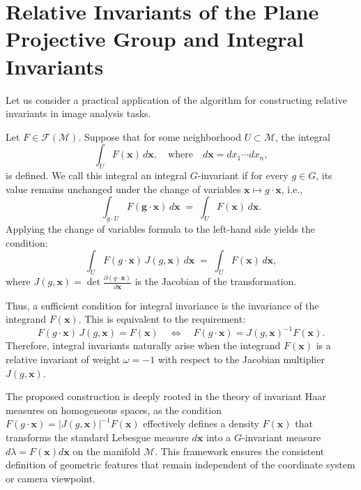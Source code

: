 \documentclass[12pt,reqno]{amsart}
\begin{document}
\section{Relative Invariants of the Plane Projective Group and Integral Invariants}

Let us consider a practical application of the algorithm for constructing relative invariants in image analysis tasks.

Let \(F \in \mathcal{F}(\mathcal{M})\). Suppose that for some neighborhood \(U \subset \mathcal{M}\), the integral
$$
\int_U F(\boldsymbol{x})\,d\boldsymbol{x}, \quad \text{where} \quad d\boldsymbol{x} = dx_1 \cdots dx_n,
$$
is defined. We call this integral an {integral \(G\)-invariant} if for every \(g \in G\), its value remains unchanged under the change of variables \(\boldsymbol{x} \mapsto g \cdot \boldsymbol{x}\), i.e.,
$$
\int_{g \cdot U} F(\boldsymbol{g \cdot \boldsymbol{x}})\,d\boldsymbol{x}
\;=\;
\int_U F(\boldsymbol{x})\,d\boldsymbol{x}.
$$
Applying the change of variables formula to the left-hand side yields the condition:
$$
\int_{U} F(g \cdot \boldsymbol{x})\, J(g, \boldsymbol{x})\,d\boldsymbol{x}
\;=\;
\int_U F(\boldsymbol{x})\,d\boldsymbol{x},
$$
where \(J(g, \boldsymbol{x}) = \det \frac{\partial (g \cdot \boldsymbol{x})}{\partial \boldsymbol{x}}\) is the Jacobian of the transformation.

Thus, a sufficient condition for integral invariance is the invariance of the integrand \(F(\boldsymbol{x})\). This is equivalent to the requirement:
$$
F(g \cdot \boldsymbol{x})\,J(g, \boldsymbol{x}) = F(\boldsymbol{x})
\quad \Longleftrightarrow \quad
F(g \cdot \boldsymbol{x}) = J(g, \boldsymbol{x})^{-1} F(\boldsymbol{x}).
$$
Therefore, integral invariants naturally arise when the integrand \(F(\boldsymbol{x})\) is a relative invariant of weight \(\omega=-1\) with respect to the Jacobian multiplier \(J(g, \boldsymbol{x})\).

The proposed construction is deeply rooted in the theory of invariant Haar measures on homogeneous spaces, as the condition $F(g \cdot \boldsymbol{x}) = |J(g, \boldsymbol{x})|^{-1} F(\boldsymbol{x})$ effectively defines a density $F(\boldsymbol{x})$ that transforms the standard Lebesgue measure $d\boldsymbol{x}$ into a $G$-invariant measure $d\lambda = F(\boldsymbol{x}) d\boldsymbol{x}$ on the manifold $\mathcal{M}$. This framework ensures the consistent definition of geometric features that remain independent of the coordinate system or camera viewpoint.
\end{document}
